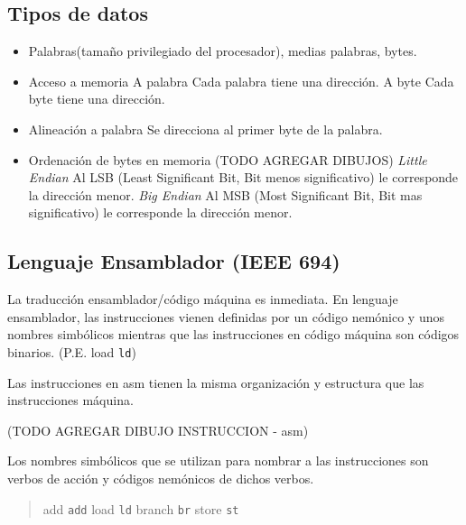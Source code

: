 \documentclass[a4paper,11pt,spanish]{report}
\begin{document}
\subsection{Tipos de datos}
\begin{itemize}
\item Palabras(tamaño privilegiado del procesador), medias palabras, bytes.
\item Acceso a memoria 
\subitem A palabra \textrightarrow Cada palabra tiene una dirección.
\subitem A byte \textrightarrow Cada byte tiene una dirección.
\item Alineación a palabra \textrightarrow Se direcciona al primer byte de la palabra.
\item Ordenación de bytes en memoria
(TODO AGREGAR DIBUJOS)
\subitem \emph{Little Endian} Al LSB (Least Significant Bit, Bit menos significativo) le corresponde la dirección menor.
\subitem \emph{Big Endian} Al MSB (Most Significant Bit, Bit mas significativo) le corresponde la dirección menor.
\end{itemize}

\subsection{Lenguaje Ensamblador (IEEE 694)}
La traducción ensamblador/código máquina es inmediata. En lenguaje ensamblador, las instrucciones vienen definidas por un código nemónico y unos nombres simbólicos mientras que las instrucciones en código máquina son códigos binarios. (P.E. load \textrightarrow \verb|ld|)

Las instrucciones en asm tienen la misma organización y estructura que las instrucciones máquina.

(TODO AGREGAR DIBUJO INSTRUCCION - asm)

Los nombres simbólicos que se utilizan para nombrar a las instrucciones son verbos de acción y códigos nemónicos de dichos verbos.
\begin{quote}
add \textrightarrow \verb|add|	load \textrightarrow \verb|ld|
branch \textrightarrow \verb|br|	store \textrightarrow \verb|st|
\end{quote}
 
\end{document}
